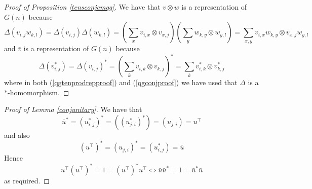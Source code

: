 \documentclass{article}
\theoremstyle{plain}
\theoremstyle{definition}
\theoremstyle{remark}
\begin{document}
\begin{proof}[Proof of Proposition \ref{tensconjcmqg}]
	We have that $v \otimes w$ is a representation of $G(n)$ because
	\begin{equation} \label{qgtenprodrepproof}
		\Delta(v_{i,j}w_{k,l})
		=
		\Delta(v_{i,j})\Delta(w_{k,l})
		=
		\left(
			\sum_x 
			v_{i,x} \otimes v_{x,j}
		\right)
		\left(
			\sum_y 
			w_{k,y} \otimes w_{y,l}
		\right)
		=
		\sum_{x,y} v_{i,x}w_{k,y} \otimes v_{x,j}w_{y,l}
	\end{equation}
	and $\bar{v}$ is a representation of $G(n)$ because
	\begin{equation} \label{qgconjproof}
		\Delta(v_{i,j}^*)
		=
		\Delta(v_{i,j})^*
		=
		\left(
			\sum_k 
			v_{i,k} \otimes v_{k,j}
		\right)^*
		=
			\sum_k 
			v_{i,k}^* \otimes v_{k,j}^*
	\end{equation}
	where in both (\ref{qgtenprodrepproof}) and (\ref{qgconjproof})
	we have used that $\Delta$ is a $*$-homomorphism.
\end{proof}

\begin{proof}[Proof of Lemma \ref{conjunitary}]
	We have that
	\begin{equation}
		\bar{u}^*
		=
		(u_{i,j}^*)^*
		=
		((u_{j,i}^*)^*)
		=
		(u_{j,i})
		=
		u^\top
	\end{equation}
	and also
	\begin{equation}
		(u^\top)^*
		=
		(u_{j,i})^*
		=
		(u_{i,j}^*)
		=
		\bar{u}
	\end{equation}
	Hence
	\begin{equation}
		u^\top(u^\top)^* 
		= 
		1 
		= 
		(u^\top)^*{u^\top}
		\iff
		\bar{u}{\bar{u}^*}
		=
		1
		=
		{\bar{u}^*}\bar{u}
	\end{equation}
	as required.	
\end{proof}
\end{document}
